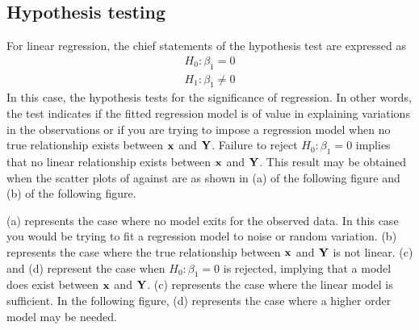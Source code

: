\documentclass[11pt]{article}
\theoremstyle{remark}
\begin{document}
\pagebreak
\subsection{Hypothesis testing}
For linear regression, the chief statements of the hypothesis test are expressed as
\begin{eqnarray}
H_0: \beta_1 = 0\nonumber\\
H_1: \beta_1 \ne 0
\end{eqnarray}
In this case, the hypothesis tests for the significance of regression. In other words, the test indicates if the fitted regression model is of value in explaining variations in the observations or if you are trying to impose a regression model when no true relationship exists between $\bold{x}$ and $\bold{Y}$. Failure to reject $H_0: \beta_1 = 0$ implies that no linear relationship exists between $\bold{x}$ and $\bold{Y}$. This result may be obtained when the scatter plots of against are as shown in (a) of the following figure and (b) of the following figure. 

\begin{figure}[h]
      \end{figure}

(a) represents the case where no model exits for the observed data. In this case you would be trying to fit a regression model to noise or random variation. (b) represents the case where the true relationship between $\bold{x}$ and $\bold{Y}$ is not linear. (c) and (d) represent the case when $H_0: \beta_1 = 0$ is rejected, implying that a model does exist between $\bold{x}$ and $\bold{Y}$. (c) represents the case where the linear model is sufficient. In the following figure, (d) represents the case where a higher order model may be needed.
\end{document}

